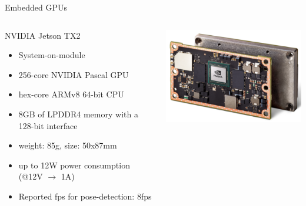 \documentclass[aspectratio=169]{beamer}
\begin{document}
\begin{frame}{Embedded GPUs}
	\begin{columns}
		\begin{column}{.6\linewidth}
			NVIDIA Jetson TX2
			\begin{itemize}
				\item System-on-module
				\item 256-core NVIDIA Pascal GPU
				\item hex-core ARMv8 64-bit CPU
				\item 8GB of LPDDR4 memory with a 128-bit interface
				\item weight: 85g, size: 50x87mm
				\item up to 12W power consumption (@12V $\rightarrow$ 1A)
				\item Reported fps for pose-detection: 8fps
			\end{itemize}
		\end{column}
		\begin{column}{.4\linewidth}
			\includegraphics[width=\textwidth]{images/jetson_tx2.png}
		\end{column}
	\end{columns}
	\vspace{5mm}
			\tiny{\color{gray}{https://devblogs.nvidia.com/parallelforall/jetson-tx2-delivers-twice-intelligence-edge/}}\\
			\tiny{\color{gray}{https://github.com/CMU-Perceptual-Computing-Lab/openpose/pull/245}}	
\end{frame}
\end{document}
